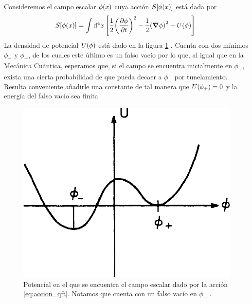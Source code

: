 Consideremos el campo escalar $\phi\qty(x)$ cuya acción $S\qty[\phi\qty(x)]$ está dada por %
\begin{equation} \label{eq:accion_qft}
S\qty[\phi\qty(x)] = \int \dd[4]{x} \qty[\frac{1}{2}\qty(\pdv{\phi}{t})^2 - \frac{1}{2}\qty(\grad{\phi})^2 - U\qty(\phi) ].
\end{equation}
La densidad de potencial $U\qty(\phi)$ está dado en la figura \ref{fig:potencial_qft} 
. Cuenta con dos mínimos $\phi_-$ y $\phi_+$, de los cuales este último es un falso vacío por lo que, al igual que en la Mecánica Cuántica, 
esperamos que, si el campo se encuentra inicialmente en $\phi_+$, 
exista una cierta probabilidad de que
pueda decaer a $\phi_-$ por tunelamiento. Resulta conveniente añadirle una constante 
de tal manera que $U\qty(\phi_+) = 0$ y la energía del falso vacío sea finita \cite{andreassen2017precision} 
\begin{figure}[b]
	\centering
	\includegraphics[scale=0.25]{FIGURAS/potencial_qft}
	\caption{Potencial en el que se encuentra el campo escalar dado por la acción \eqref{eq:accion_qft}. Notamos que cuenta con un falso vacío en $\phi_+$ \cite{callan1977fate}.}
	\label{fig:potencial_qft}
\end{figure}

